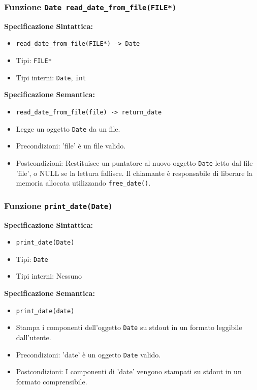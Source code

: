 \documentclass[11pt]{scrartcl} %
\begin{document}
\subsubsection{Funzione \texttt{Date read\_date\_from\_file(FILE*)}}

\textbf{Specificazione Sintattica:}
\begin{itemize}
	\item \texttt{read\_date\_from\_file(FILE*) -> Date}
	\item Tipi: \texttt{FILE*}
	\item Tipi interni: \texttt{Date}, \texttt{int}
\end{itemize}

\textbf{Specificazione Semantica:}
\begin{itemize}
	\item \texttt{read\_date\_from\_file(file) -> return\_date}
	\item Legge un oggetto \texttt{Date} da un file.
	\item Precondizioni: 'file' è un file valido.
	\item Postcondizioni: Restituisce un puntatore al nuovo oggetto \texttt{Date} letto dal file 'file', o NULL se la lettura fallisce. Il chiamante è responsabile di liberare la memoria allocata utilizzando \texttt{free\_date()}.
\end{itemize}

\subsubsection{Funzione \texttt{print\_date(Date)}}

\textbf{Specificazione Sintattica:}
\begin{itemize}
	\item \texttt{print\_date(Date)}
	\item Tipi: \texttt{Date}
	\item Tipi interni: Nessuno
\end{itemize}

\textbf{Specificazione Semantica:}
\begin{itemize}
	\item \texttt{print\_date(date)}
	\item Stampa i componenti dell'oggetto \texttt{Date} su stdout in un formato leggibile dall'utente.
	\item Precondizioni: 'date' è un oggetto \texttt{Date} valido.
	\item Postcondizioni: I componenti di 'date' vengono stampati su stdout in un formato comprensibile.
\end{itemize}
\end{document}
